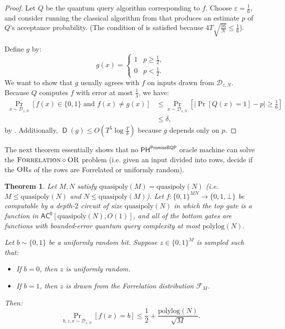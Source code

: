 \documentclass[11pt]{article}%
\newtheorem{theorem}{Theorem}
\newcommand{\eps}{\varepsilon}
\newcommand{\polylog}{\mathrm{polylog}}
\newcommand{\quasipoly}{\mathrm{quasipoly}}
\newcommand{\OR}{\normalfont\textsc{OR}}
\newcommand{\Forrelation}{\normalfont\textsc{Forrelation}}
\DeclareMathOperator{\D}{\mathsf{D}}
\begin{document}
\begin{proof}
Let $Q$ be the quantum query algorithm corresponding to $f$. Choose $\eps = \frac{1}{6}$, and consider running the classical algorithm from  that produces an estimate $p$ of $Q$'s acceptance probability. (The condition of  is satisfied because $4T\sqrt{\frac{16}{N}} \le \frac{1}{6}$).

Define $g$ by:
\[
g(x) = \begin{cases}
1 & p \ge \frac{1}{2},\\
0 & p < \frac{1}{2}.
\end{cases}
\]
We want to show that $g$ usually agrees with $f$ on inputs drawn from $\mathcal{D}_{z,N}$. Because $Q$ computes $f$ with error at most $\frac{1}{3}$, we have:
\begin{align*}
\Pr_{x \sim \mathcal{D}_{z,N}}\left[f(x) \in \{0,1\} \text{ and } f(x) \neq g(x)\right] &\le \Pr_{x \sim \mathcal{D}_{z,N}}\left[|\Pr[Q(x) = 1] - p| \ge \frac{1}{6} \right]\\
&\le \delta,
\end{align*}
by . Additionally, $\D(g) \le O\left(T^5 \log \frac{T}{\delta}\right)$ because $g$ depends only on $p$.
\end{proof}

The next theorem essentially shows that no $\mathsf{PH}^\mathsf{PromiseBQP}$ oracle machine can solve the $\Forrelation \circ \OR$ problem (i.e. given an input divided into rows, decide if the $\OR$s of the rows are Forrelated or uniformly random).

\begin{theorem}
\label{thm:ph^bqp_forrelation_of_ors}
Let $M, N$ satisfy $\quasipoly(M) = \quasipoly(N)$ (i.e. $M \le \quasipoly(N)$ and $N \le \quasipoly(M)$). Let $f: \{0,1\}^{MN} \to \{0,1,\bot\}$ be computable by a depth-$2$ circuit of size $\quasipoly(N)$ in which the top gate is a function in $\mathsf{AC^0}[\quasipoly(N), O(1)]$, and all of the bottom gates are functions with bounded-error quantum query complexity at most $\polylog(N)$.

Let $b \sim \{0,1\}$ be a uniformly random bit. Suppose $z \in \{0,1\}^{M}$ is sampled such that:
\begin{itemize}
\item If $b = 0$, then $z$ is uniformly random.
\item If $b = 1$, then $z$ is drawn from the Forrelation distribution $\mathcal{F}_M$.
\end{itemize}
Then:
\[
\Pr_{b,z,x \sim \mathcal{D}_{z,N}} \left[f(x) = b \right] \le \frac{1}{2} + \frac{\polylog(N)}{\sqrt{M}}.
\]
\end{theorem}
\end{document}

